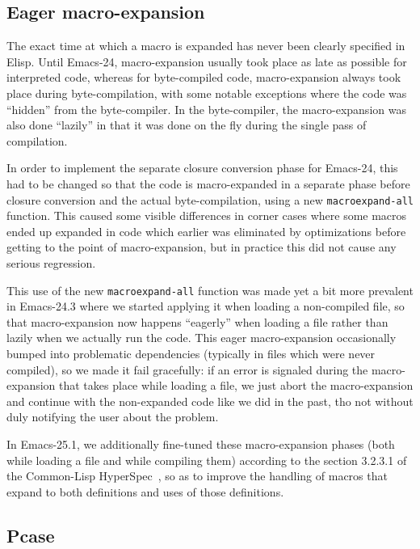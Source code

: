 \documentclass[format=acmsmall, review=false, screen=true]{acmart}
\newcommand \Elisp {Elisp}
\begin{document}
\subsection{Eager macro-expansion} %

The exact time at which a macro is expanded has never been clearly specified
in \Elisp{}.  Until Emacs-24, macro-expansion usually took place as late as
possible for interpreted code, whereas for byte-compiled code,
macro-expansion always took place during byte-compilation, with some notable
exceptions where the code was ``hidden'' from the byte-compiler.  In the
byte-compiler, the macro-expansion was also done ``lazily'' in that it was
done on the fly during the single pass of compilation.

In order to implement the separate closure conversion phase for Emacs-24,
this had to be changed so that the code is macro-expanded in a separate
phase before closure conversion and the actual byte-compilation, using a new
\texttt{macroexpand-all} function.
This caused some visible differences in corner cases where some macros ended
up expanded in code which earlier was eliminated by optimizations before
getting to the point of macro-expansion, but in practice this did not cause
any serious regression.

This use of the new \texttt{macroexpand-all} function was made yet a bit
more prevalent in Emacs-24.3 where we started applying it when loading
a non-compiled file, so that macro-expansion now happens ``eagerly'' when
loading a file rather than lazily when we actually run the code.  This eager
macro-expansion occasionally bumped into problematic dependencies (typically
in files which were never compiled), so we made it fail gracefully: if an
error is signaled during the macro-expansion that takes place while loading
a file, we just abort the macro-expansion and continue with the non-expanded
code like we did in the past, tho not without duly notifying the user about
the problem.

In Emacs-25.1, we additionally fine-tuned these macro-expansion phases (both
while loading a file and while compiling them) according to the section
3.2.3.1 of the Common-Lisp HyperSpec~\cite{HyperSpec}, so as to improve the
handling of macros that expand to both definitions and uses of
those definitions.

\subsection{Pcase}           %
\end{document}
